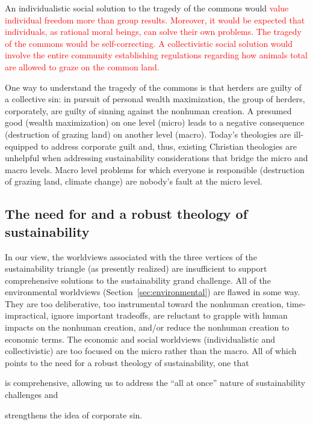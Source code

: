 \documentclass[12pt]{article}
\newcommand{\ins}[1]{\textcolor{red}{#1}}
\begin{document}
An individualistic social solution to the tragedy of the commons 
would \ins{value individual freedom more than group results.
Moreover, it would be expected that individuals, as rational moral beings,
can solve their own problems. The tragedy of the commons would be self-correcting.}
\ins{A collectivistic social solution would involve 
the entire community establishing 
regulations regarding how animals total are allowed to graze on the common land.}

One way to understand the tragedy of the commons
is that herders are guilty of a collective sin:
in pursuit of personal wealth maximization, 
the group of herders, corporately, are guilty of sinning against the nonhuman creation.
A presumed good (wealth maximization) on one level (micro)
leads to a negative consequence (destruction of grazing land) on another level (macro).
Today's theologies are ill-equipped to address corporate guilt
and, thus, existing Christian theologies are unhelpful 
when addressing sustainability considerations that bridge the micro and macro levels.
Macro level problems for which everyone is responsible 
(destruction of grazing land, climate change)
are nobody's fault at the micro level.


\subsection{The need for and a robust theology of sustainability}
\label{sec:needs}

In our view,
the worldviews associated with the three vertices of the sustainability triangle
(as presently realized) 
are insufficient to support comprehensive solutions to the sustainability grand challenge.
All of the environmental worldviews (Section~\ref{sec:environmental})
are flawed in some way. They are
too deliberative, too instrumental toward the nonhuman creation,
time-impractical, 
ignore important tradeoffs, 
are reluctant to grapple with human impacts on the nonhuman creation, and/or
reduce the nonhuman creation to economic terms.
The economic and social worldviews (individualistic and collectivistic) 
are too focused on the micro rather than the macro.
All of which points to the need for a robust theology of sustainability, 
one that 
%
\begin{enumerate*}[label={(\alph*)}]

  \item is comprehensive, allowing us to address the ``all at once'' nature of sustainability challenges and

  \item strengthens the idea of corporate sin.
  
\end{enumerate*}
\end{document}
